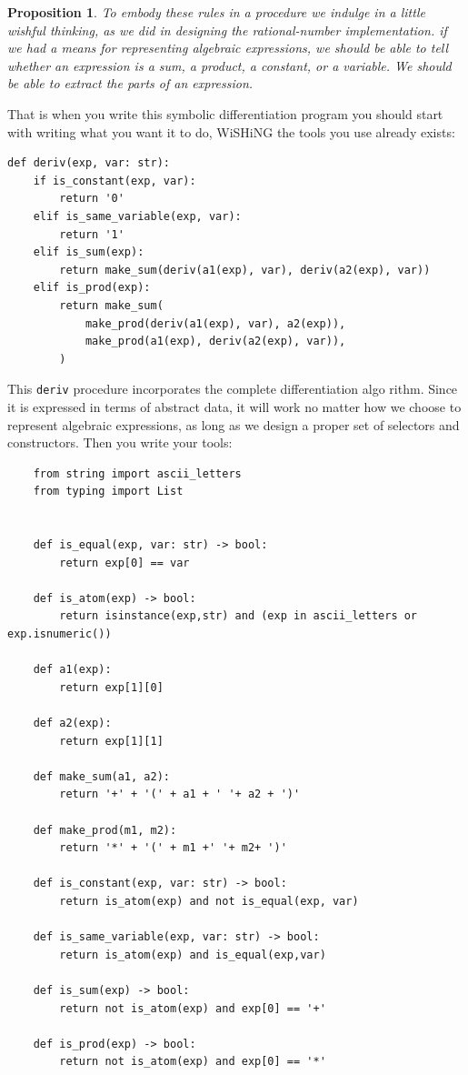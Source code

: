 \documentclass[a4paper,twoside]{article}
\newtheorem{proposition}[theorem]{Proposition}
\numberwithin{equation}{section}
\begin{document}
\begin{proposition}
    To embody these rules in a procedure we indulge in a little wishful thinking, as we did in designing the rational-number implementation. if we had a means for representing algebraic expressions, we should be able to tell whether an expression is a sum, a product, a constant, or a variable. We should be able to extract the parts of an expression.
\end{proposition}
That is when you write this symbolic differentiation program you should start with writing what you want it to do, WiSHiNG the tools you use already exists:
\begin{lstlisting}
def deriv(exp, var: str):
    if is_constant(exp, var):
        return '0'
    elif is_same_variable(exp, var):
        return '1'
    elif is_sum(exp):
        return make_sum(deriv(a1(exp), var), deriv(a2(exp), var))
    elif is_prod(exp):
        return make_sum(
            make_prod(deriv(a1(exp), var), a2(exp)),
            make_prod(a1(exp), deriv(a2(exp), var)),
        )
\end{lstlisting}
This \texttt{deriv} procedure incorporates the complete differentiation algo rithm. Since it is expressed in terms of abstract data, it will work no matter how we choose to represent algebraic expressions, as long as we design a proper set of selectors and constructors. Then you write your tools:
\begin{lstlisting}
    from string import ascii_letters
    from typing import List
    
    
    def is_equal(exp, var: str) -> bool:
        return exp[0] == var
    
    def is_atom(exp) -> bool:
        return isinstance(exp,str) and (exp in ascii_letters or exp.isnumeric())
    
    def a1(exp):
        return exp[1][0]
    
    def a2(exp):
        return exp[1][1]
    
    def make_sum(a1, a2):
        return '+' + '(' + a1 + ' '+ a2 + ')'
    
    def make_prod(m1, m2):
        return '*' + '(' + m1 +' '+ m2+ ')'
    
    def is_constant(exp, var: str) -> bool:
        return is_atom(exp) and not is_equal(exp, var)
    
    def is_same_variable(exp, var: str) -> bool:
        return is_atom(exp) and is_equal(exp,var)
    
    def is_sum(exp) -> bool:
        return not is_atom(exp) and exp[0] == '+'
    
    def is_prod(exp) -> bool:
        return not is_atom(exp) and exp[0] == '*'
\end{lstlisting}
\end{document}

